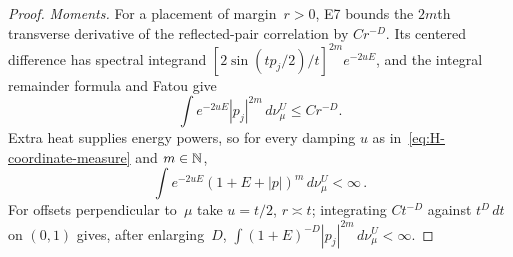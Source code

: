 \begin{proof}
\emph{Moments.} For a placement of margin~$r>0$, E7 bounds the $2m$th transverse derivative of the reflected-pair correlation by $Cr^{-D}$. Its centered difference has spectral integrand $[2\sin(tp_j/2)/t]^{2m}e^{-2uE}$, and the integral remainder formula and Fatou give
\begin{equation}\label{eq:H-coordinate-moments}
\int e^{-2uE}|p_j|^{2m}\,d\nu_\mu^U\le Cr^{-D}.
\end{equation}
Extra heat supplies energy powers, so for every damping $u$ as in~\eqref{eq:H-coordinate-measure} and $m\in\mathbb{N}$,
\begin{equation}\label{eq:H-all-moments}
\int e^{-2uE}(1+E+|p|)^m\,d\nu_\mu^U<\infty\,.
\end{equation}
For offsets perpendicular to~$\mu$ take $u=t/2$, $r\asymp t$; integrating $Ct^{-D}$ against $t^D\,dt$ on $(0,1)$ gives, after enlarging~$D$, $\int(1+E)^{-D}|p_j|^{2m}\,d\nu_\mu^U<\infty$.


\end{proof}
